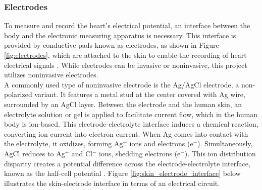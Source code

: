 \subsubsection{Electrodes}
\vspace{1em}
To measure and record the heart's electrical potential, an interface between the body and the electronic measuring apparatus is necessary. This interface is provided by conductive pads known as electrodes, as shown in Figure \ref{fig:electrodes}, which are attached to the skin to enable the recording of heart electrical signals \cite{webster_medical_2020}. While electrodes can be invasive or noninvasive, this project utilizes noninvasive electrodes.\\

\noindent A commonly used type of noninvasive electrode is the Ag/AgCl electrode, a non-polarized variant. It features a metal stud at the center covered with Ag wire, surrounded by an AgCl layer. Between the electrode and the human skin, an electrolyte solution or gel is applied to facilitate current flow, which in the human body is ion-based. This electrode-electrolyte interface induces a chemical reaction, converting ion current into electron current. When Ag comes into contact with the electrolyte, it oxidizes, forming Ag\(^+\) ions and electrons (e\(^-\)). Simultaneously, AgCl reduces to Ag\(^+\) and Cl\(^-\) ions, shedding electrons (e\(^-\)). This ion distribution disparity creates a potential difference across the electrode-electrolyte interface, known as the half-cell potential \cite{lee_kruse_2020}. Figure \ref{fig:skin_electrode_interface} below illustrates the skin-electrode interface in terms of an electrical circuit.

